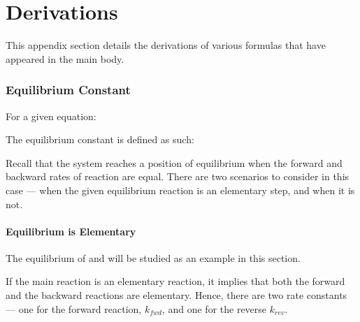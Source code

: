 
\pagebreak
\hypertarget{AppendixDerivations}{}
\part{Derivations}

	This appendix section details the derivations of various formulas that have appeared in the main body.

	\section{Equilibrium Constant}

		For a given equation:


		The equilibrium constant is defined as such:

		\eqndiagram{
			 \[ K_{c} = \frac{[C]^{c}[D]^{d}}{[A]^{a}[B]^{b}} \]
		}

		Recall that the system reaches a position of equilibrium when the forward and backward rates of reaction are equal. There are two
		scenarios to consider in this case --- when the given equilibrium reaction is an elementary step, and when it is not.

		\subsection{Equilibrium is Elementary}

			The equilibrium of  and  will be studied as an example in this section.


			If the main reaction is an elementary reaction, it implies that both the forward and the backward reactions are elementary. Hence,
			there are two rate constants --- one for the forward reaction, $k_{fwd}$, and one for the reverse $k_{rev}$.

